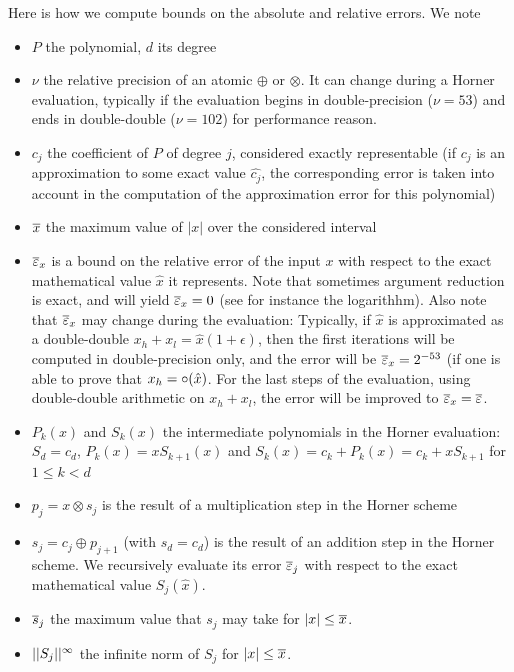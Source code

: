 Here is how we compute bounds on the absolute and relative errors. We note 
\begin{itemize}

\item $P$ the polynomial, $d$ its degree
  
\item $\nu$ the relative precision of an atomic $\oplus$ or $\otimes$.
  It can change during a Horner evaluation, typically if the
  evaluation begins in double-precision ($\nu=53$) and ends in
  double-double ($\nu=102$) for performance reason.

\item $c_j$ the coefficient of $P$ of degree $j$, considered exactly
  representable (if $c_j$ is an approximation to some exact value
  $\hat{c_j}$, the corresponding error is taken into account in the
  computation of the approximation error for this polynomial)

\item ${\overline{x}}$ the maximum value of $|x|$ over the considered interval
  
\item ${\overline{\varepsilon}}_x$ is a bound on the relative error of the input $x$
  with respect to the exact mathematical value $\hat{x}$ it
  represents. Note that sometimes argument reduction is exact, and
  will yield ${\overline{\varepsilon}}_x=0$ (see for instance the logarithhm). Also
  note that ${\overline{\varepsilon}}_x$ may change during the evaluation: Typically,
  if $\hat{x}$ is approximated as a double-double
  $x_h+x_l=\hat{x}(1+\epsilon)$, then the first iterations will be
  computed in double-precision only, and the error will be
  ${\overline{\varepsilon}}_x=2^{-53}$ (if one is able to prove that
  $x_h=\circ(\hat{x})$. For the last steps of the evaluation, using
  double-double arithmetic on $x_h+x_l$, the error will be improved to
  ${\overline{\varepsilon}}_x={\overline{\varepsilon}}$.

\item $P_k(x)$ and $S_k(x)$ the intermediate polynomials in the Horner evaluation:
  $S_d=c_d$, $P_k(x)=xS_{k+1}(x)$ and $S_k(x) = c_k+P_{k}(x) = c_k+xS_{k+1}$ for $1\le k <d$

\item $p_j = x \otimes s_j $ is the result of a multiplication step in the Horner scheme

\item $s_j = c_j \oplus p_{j+1}$ (with $s_d = c_d$) is the result of
  an addition step in the Horner scheme. We recursively evaluate its
  error ${\overline{\varepsilon}}_j$ with respect to the exact mathematical value $S_j(\hat{x})$.

\item $\overline{s}_{j}$ the  maximum value that $s_j$ may take for $|x|
  \le {\overline{x}}$.

\item $||{S_j}||^{\infty}$ the infinite norm of $S_j$ for $|x| \leq {\overline{x}}$.

\end{itemize}

